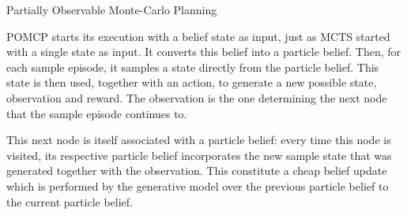 \begin{algorithm}[H]
    \caption{Partially Observable Monte-Carlo Planning}
\begin{multicols}{2}


    \setcounter{AlgoLine}{0}

    \setcounter{AlgoLine}{0}

\end{multicols}
\end{algorithm}

POMCP starts its execution with a belief state as input, just as MCTS started with a single state as
input. It converts this belief into a particle belief. Then, for each sample episode, it samples a
state directly from the particle belief. This state is then used, together with an action, to
generate a new possible state, observation and reward. The observation is the one determining the
next node that the sample episode continues to.

This next node is itself associated with a particle belief: every time this node is visited, its
respective particle belief incorporates the new sample state that was generated together with the
observation. This constitute a cheap belief update which is performed by the generative model over
the previous particle belief to the current particle belief.

